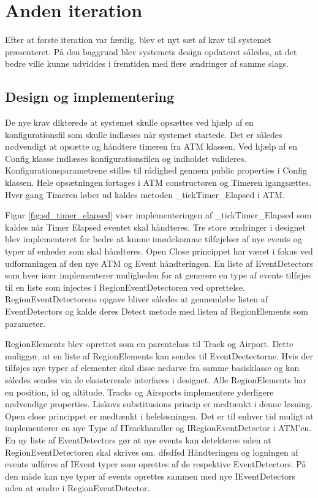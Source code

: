 \thispagestyle{fancy}
\chapter{Anden iteration}
\label{chp:seconditteration}
Efter at første iteration var færdig, blev et nyt sæt af krav til systemet præsenteret. På den baggrund blev systemets design opdateret således, at det bedre ville kunne udviddes i fremtiden med flere ændringer af samme slags. 

\section{Design og implementering}
De nye krav dikterede at systemet skulle opsættes ved hjælp af en konfigurationsfil som skulle indlæses når systemet startede. Det er således nødvendigt at opsætte og håndtere timeren fra ATM klassen. Ved hjælp af en Config klasse indlæses konfigurationsfilen og indholdet valideres. Konfigurationsparametrene stilles til rådighed gennem public properties i Config klassen. Hele opsætningen fortages i ATM constructoren og Timeren igangsættes. Hver gang Timeren løber ud kaldes metoden \_tickTimer\_Elapsed i ATM. 


Figur \ref{fig:sd_timer_elapsed} viser implementeringen af \_tickTimer\_Elapsed som kaldes når Timer Elapsed eventet skal håndteres. Tre store ændringer i designet blev implementeret for bedre at kunne imødekomme tilføjelser af nye events og typer af enheder som skal håndteres. Open Close princippet har været i fokus ved udformningen af den nye ATM og Event håndteringen.
En liste af EventDetectors som hver især implementerer muligheden for at generere en type af events tilføjes til en liste som injectes i RegionEventDetectoren ved oprettelse. RegionEventDetectorens opgave bliver således at gennemløbe listen af EventDetectors og kalde deres Detect metode med listen af RegionElements som parameter.

RegionElements blev oprettet som en parentclass til Track og Airport. Dette muliggør, at en liste af RegionElements kan sendes til EventDectectorne. Hvis der tilføjes nye typer af elementer skal disse nedarve fra samme basisklasse og kan således sendes via de eksisterende interfaces i designet. Alle RegionElements har en position, id og altitude. Tracks og Airsports implementere yderligere nødvendige properties. Liskovs substitusions princip er medtænkt i denne løsning.
Open close princippet er medtænkt i heleløsningen. Det er til enhver tid muligt at implementerer en nye Type af ITrackhandler og IRegionEventDetector i ATM'en. En ny liste af EventDetectors gør at nye events kan detekteres uden at RegionEventDetectoren skal skrives om. 
dfsdfsd 
Håndteringen og logningen af events udføres af IEvent typer som oprettes af de respektive EventDetectors. På den måde kan nye typer af events oprettes sammen med nye IEventDetectors uden at ændre i RegionEventDetector.

